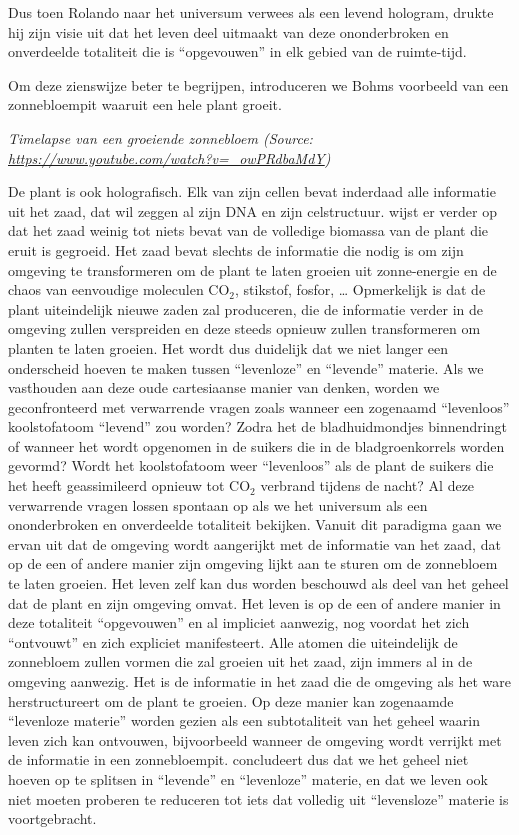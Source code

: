 \documentclass[
  11pt,
]{book}
\begin{document}
Dus toen Rolando naar het universum verwees als een levend hologram, drukte hij zijn visie uit dat het leven deel uitmaakt van deze ononderbroken en onverdeelde totaliteit die is ``opgevouwen'' in elk gebied van de ruimte-tijd.

Om deze zienswijze beter te begrijpen, introduceren we Bohms voorbeeld van een zonnebloempit waaruit een hele plant groeit.

\emph{Timelapse van een groeiende zonnebloem (Source: \url{https://www.youtube.com/watch?v=_owPRdbaMdY})}

De plant is ook holografisch. Elk van zijn cellen bevat inderdaad alle informatie uit het zaad, dat wil zeggen al zijn DNA en zijn celstructuur. \citet{bohm1980} wijst er verder op dat het zaad weinig tot niets bevat van de volledige biomassa van de plant die eruit is gegroeid. Het zaad bevat slechts de informatie die nodig is om zijn omgeving te transformeren om de plant te laten groeien uit zonne-energie en de chaos van eenvoudige moleculen CO\(_2\), stikstof, fosfor, \ldots{} Opmerkelijk is dat de plant uiteindelijk nieuwe zaden zal produceren, die de informatie verder in de omgeving zullen verspreiden en deze steeds opnieuw zullen transformeren om planten te laten groeien. Het wordt dus duidelijk dat we niet langer een onderscheid hoeven te maken tussen ``levenloze'' en ``levende'' materie. Als we vasthouden aan deze oude cartesiaanse manier van denken, worden we geconfronteerd met verwarrende vragen zoals wanneer een zogenaamd ``levenloos'' koolstofatoom ``levend'' zou worden? Zodra het de bladhuidmondjes binnendringt of wanneer het wordt opgenomen in de suikers die in de bladgroenkorrels worden gevormd? Wordt het koolstofatoom weer ``levenloos'' als de plant de suikers die het heeft geassimileerd opnieuw tot CO\(_2\) verbrand tijdens de nacht? Al deze verwarrende vragen lossen spontaan op als we het universum als een ononderbroken en onverdeelde totaliteit bekijken. Vanuit dit paradigma gaan we ervan uit dat de omgeving wordt aangerijkt met de informatie van het zaad, dat op de een of andere manier zijn omgeving lijkt aan te sturen om de zonnebloem te laten groeien. Het leven zelf kan dus worden beschouwd als deel van het geheel dat de plant en zijn omgeving omvat. Het leven is op de een of andere manier in deze totaliteit ``opgevouwen'' en al impliciet aanwezig, nog voordat het zich ``ontvouwt'' en zich expliciet manifesteert. Alle atomen die uiteindelijk de zonnebloem zullen vormen die zal groeien uit het zaad, zijn immers al in de omgeving aanwezig. Het is de informatie in het zaad die de omgeving als het ware herstructureert om de plant te groeien. Op deze manier kan zogenaamde ``levenloze materie'' worden gezien als een subtotaliteit van het geheel waarin leven zich kan ontvouwen, bijvoorbeeld wanneer de omgeving wordt verrijkt met de informatie in een zonnebloempit. \citet{bohm1980} concludeert dus dat we het geheel niet hoeven op te splitsen in ``levende'' en ``levenloze'' materie, en dat we leven ook niet moeten proberen te reduceren tot iets dat volledig uit ``levensloze'' materie is voortgebracht.
\end{document}
